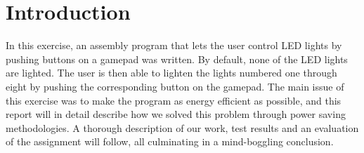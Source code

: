 \section{Introduction}

In this exercise, an assembly program that lets the user control LED lights by pushing buttons on a gamepad was written.
By default, none of the LED lights are lighted.
The user is then able to lighten the lights numbered one through eight by pushing the corresponding button on the gamepad.
The main issue of this exercise was to make the program as energy efficient as possible, and this report will in detail describe how we solved this problem through power saving methodologies.
A thorough description of our work, test results and an evaluation of the assignment will follow, all culminating in a mind-boggling conclusion.
